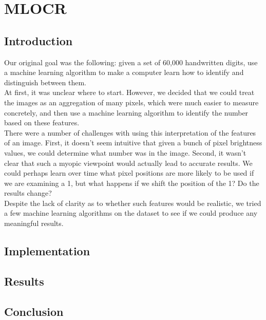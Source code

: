 \documentclass{article}
\theoremstyle{remark}
\begin{document}
	 \section*{MLOCR}
	\label*{Optical Character Recognition using Machine Learning}
	   \subsection*{Introduction}
     Our original goal was the following: given a set of 60,000 handwritten digits, use a machine learning algorithm to make a computer learn how to identify and distinguish between them. \\

     At first, it was unclear where to start. However, we decided that we could treat the images as an aggregation of many pixels, which were much easier to measure concretely, and then use a machine learning algorithm to identify the number based on these features. \\

     There were a number of challenges with using this interpretation of the features of an image. First, it doesn't seem intuitive that given a bunch of pixel brightness values, we could determine what number was in the image. Second, it wasn't clear that such a myopic viewpoint would actually lead to accurate results. We could perhaps learn over time what pixel positions are more likely to be used if we are examining a 1, but what happens if we shift the position of the 1? Do the results change? \\

     Despite the lack of clarity as to whether such features would be realistic, we tried a few machine learning algorithms on the dataset to see if we could produce any meaningful results.
     \subsection*{Implementation}

     \subsection*{Results}

     \subsection*{Conclusion}



    
\end{document}
